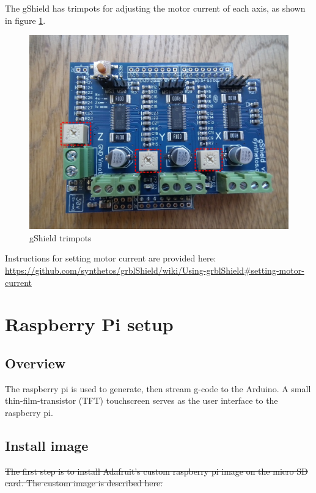 \documentclass[
]{book}
\begin{document}
The gShield has trimpots for adjusting the motor current of each axis, as shown in figure \ref{fig:gShield}.

\begin{figure}

{\centering \includegraphics[width=0.75\linewidth]{images/gShield-trimpots} 

}

\caption{gShield trimpots}\label{fig:gShield}
\end{figure}

Instructions for setting motor current are provided here:
\url{https://github.com/synthetos/grblShield/wiki/Using-grblShield\#setting-motor-current}

\hypertarget{raspi}{%
\chapter{Raspberry Pi setup}\label{raspi}}

\hypertarget{overview-1}{%
\section{Overview}\label{overview-1}}

The raspberry pi is used to generate, then stream g-code to the Arduino. A small thin-film-transistor (TFT) touchscreen serves as the user interface to the raspberry pi.

\hypertarget{install-image}{%
\section{Install image}\label{install-image}}

\st{The first step is to install Adafruit's custom raspberry pi image on the micro SD card. The custom image is described here:}
\end{document}

